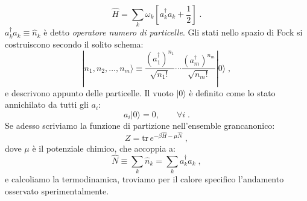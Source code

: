 \documentclass[12pt,a4paper]{article}
\theoremstyle{definition}
\newcommand{\pdev}[3][]{\frac{\partial^{#1} #2}{\partial #3^{#1}}}
\numberwithin{equation}{section}
\newcommand{\ket}{\rangle}
\newcommand{\Sch}{Schrödinger}
\newcommand{\adj}[1]{#1^{\dagger}}
\newcommand{\tr}{\mathrm{tr}}
\begin{document}
\begin{equation}
\hat{H}=\sum_k\omega_k\left[\adj{a}_ka_k+\frac{1}{2}\right]\;.
\end{equation}
$\adj{a}_ka_k\equiv \hat{n}_k$ è detto \emph{operatore numero di particelle}. Gli stati nello spazio di Fock si costruiscono secondo il solito schema:
\begin{equation}
|n_1,n_2,\ldots,n_m\ket\equiv\frac{(\adj{a}_1)^{n_1}}{\sqrt{n_1!}}\cdots \frac{(\adj{a}_m)^{n_m}}{\sqrt{n_m!}}|0\ket\;,
\end{equation}
e descrivono appunto delle particelle. Il vuoto $|0\ket$ è definito come lo stato annichilato da tutti gli $a_i$:
\begin{equation}
a_i|0\ket=0,\qquad \forall i\;.
\end{equation}
Se adesso scriviamo la funzione di partizione nell'ensemble grancanonico:
\begin{equation}
Z=\tr\, e^{-\beta\hat{H}-\mu\hat{N}}\;,
\end{equation}
dove $\mu$ è il potenziale chimico, che accoppia a:
\begin{equation}
\hat{N}\equiv\sum_k \hat{n}_k=\sum_k \adj{a}_ka_k\;,
\end{equation}
e calcoliamo la termodinamica, troviamo per il calore specifico l'andamento osservato sperimentalmente.
\end{document}
